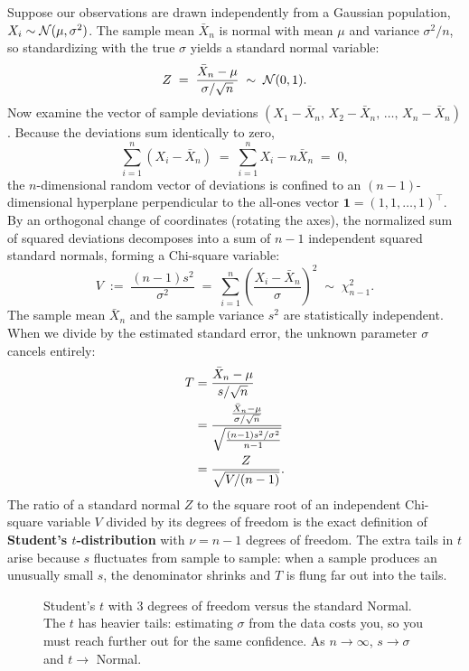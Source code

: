 Suppose our observations are drawn independently from a Gaussian population, $X_i \sim \mathcal{N}(\mu, \sigma^2)$. The sample mean $\bar X_n$ is normal with mean $\mu$ and variance $\sigma^2/n$, so standardizing with the true $\sigma$ yields a standard normal variable:
\[
  Z \;=\; \frac{\bar X_n - \mu}{\sigma/\sqrt n} \;\sim\; \mathcal{N}(0,1).
\]
Now examine the vector of sample deviations $(X_1 - \bar X_n, \, X_2 - \bar X_n, \, \dots, \, X_n - \bar X_n)$. Because the deviations sum identically to zero,
\[
  \sum_{i=1}^n (X_i - \bar X_n) \;=\; \sum_{i=1}^n X_i - n\bar X_n \;=\; 0,
\]
the $n$-dimensional random vector of deviations is confined to an $(n-1)$-dimensional hyperplane perpendicular to the all-ones vector $\mathbf{1} = (1,1,\dots,1)^\top$. By an orthogonal change of coordinates (rotating the axes), the normalized sum of squared deviations decomposes into a sum of $n-1$ independent squared standard normals, forming a Chi-square variable:
\[
  V \;:=\; \frac{(n-1)s^2}{\sigma^2} \;=\; \sum_{i=1}^n \left(\frac{X_i - \bar X_n}{\sigma}\right)^2 \;\sim\; \chi^2_{n-1}.
\]
The sample mean $\bar X_n$ and the sample variance $s^2$ are statistically independent. When we divide by the estimated standard error, the unknown parameter $\sigma$ cancels entirely:
\begin{align}
  T &= \frac{\bar X_n - \mu}{s/\sqrt n} \label{ch32:t-ratio-derivation} \\
    &= \frac{\frac{\bar X_n - \mu}{\sigma/\sqrt n}}{\sqrt{\frac{(n-1)s^2/\sigma^2}{n-1}}} \notag \\
    &= \frac{Z}{\sqrt{V/(n-1)}}. \notag
\end{align}
The ratio of a standard normal $Z$ to the square root of an independent Chi-square variable $V$ divided by its degrees of freedom is the exact definition of \textbf{Student's $t$-distribution} with $\nu = n-1$ degrees of freedom. The extra tails in $t$ arise because $s$ fluctuates from sample to sample: when a sample produces an unusually small $s$, the denominator shrinks and $T$ is flung far out into the tails.

\begin{figure}[H]
\centering
{}
\caption{Student's $t$ with $3$ degrees of freedom versus the standard Normal. The $t$
has heavier tails: estimating $\sigma$ from the data costs you, so you must reach
further out for the same confidence. As $n\to\infty$, $s\to\sigma$ and $t\to$ Normal.}
\label{ch32:fig-t}
\end{figure}

